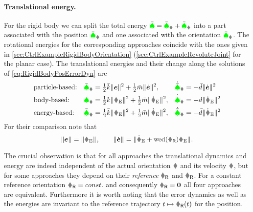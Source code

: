 \paragraph{Translational energy.}
For the rigid body we can split the total energy $\totalEnergyC = \totalEnergyC_{\r} + \totalEnergyC_{\R}$ into a part associated with the position $\totalEnergyC_{\r}$ and one associated with the orientation $\totalEnergyC_{\R}$.
The rotational energies for the corresponding approaches coincide with the ones given in \autoref{sec:CtrlExampleRigidBodyOrientation} (\autoref{sec:CtrlExampleRevoluteJoint} for the planar case).
The translational energies and their change along the solutions of \eqref{eq:RigidBodyPosErrorDyn} are
\begin{subequations}
\begin{align}
 &\text{particle-based:}&
 \totalEnergyC_{\r} &= \tfrac{1}{2} \kc \norm{\tuple{e}}^2 + \tfrac{1}{2} \mc \norm{\dot{\tuple{e}}}^2,&
 \dot{\totalEnergyC}_{\r} &= -\dc\norm{\dot{\tuple{e}}}^2
\\
 &\text{body-based:}&
 \totalEnergyC_{\r} &= \tfrac{1}{2} \kc \norm{\rE}^2 + \tfrac{1}{2} \mc \norm{\rEd}^2,&
 \dot{\totalEnergyC}_{\r} &= -\dc\norm{\rEd}^2 
\\
 &\text{energy-based:}&
 \totalEnergyC_{\r} &= \tfrac{1}{2} \kc \norm{\rE}^2 + \tfrac{1}{2} \mc \norm{\rEd}^2,&
 \dot{\totalEnergyC}_{\r} &= -\dc\norm{\rEd}^2 
\end{align}
\end{subequations}
For their comparison note that
\begin{align}
 \norm{\tuple{e}} = \norm{\rE},
\qquad
 \norm{\dot{\tuple{e}}} = \norm{\rEd + \wedOp(\wR) \rE}.
\end{align}

The crucial observation is that for all approaches the translational dynamics and energy are indeed independent of the actual orientation $\R$ and its velocity $\w$, but for some approaches they depend on their \textit{reference} $\RR$ and $\wR$.
For a constant reference orientation $\RR = \const$ and consequently $\wR = \tuple{0}$ all four approaches are equivalent.
Furthermore it is worth noting that the error dynamics as well as the energies are invariant to the reference trajectory $t\mapsto\rR(t)$ for the position.

